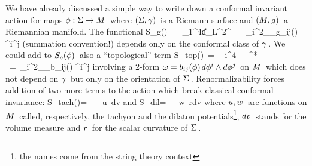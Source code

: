 \no We have already discussed a simple way
to write down a conformal invariant action
for maps \s$\phi:\Sigma\rightarrow M\hspace{0.05cm}$ where
\s$(\Sigma,{{\gamma}})\hspace{0.05cm}$ is a Riemann surface and \s$(M,g)\hspace{0.05cm}$
a Riemannian manifold. The functional
\qq
S_g(\phi)\ =\ {_1\over^{4\pi}}\m\|d\phi\|_{L^2}^{}\ =\
{_i\over^{2\pi}}\int_{_\Sigma}g_{ij}(\phi)
\s\s\da\phi^i\wedge\de\phi^j
\label{sm}
\qqq
(summation convention!) depends only on the conformal
class of \s${{\gamma}}\hspace{0.05cm}$.
We could add to \s$S_g(\phi)\hspace{0.05cm}$ also a ``topological'' term
\qq
S_{top}(\phi)\ =\ {_i\over^{4\pi}}\s\int_{_\Sigma}\phi^*\omega
\ =\ {_i\over^{2\pi}}\int_{_\Sigma}b_{ij}(\phi)
\s\s\da\phi^i\wedge\de\phi^j
\label{stop}
\qqq
involving a 2-form \s$\omega=b_{ij}(\phi)\hspace{0.05cm} d\phi^i
\wedge d\phi^j\hspace{0.05cm}$ on \s$M\hspace{0.05cm}$ which does not
depend on \s${{\gamma}}\hspace{0.05cm}$ but only on the orientation of \s$\Sigma\hspace{0.05cm}$.
Renormalizability forces addition of two more terms
to the action which break classical conformal invariance:
\qq
S_{tach}(\phi)\s=\s{_1\over^{4\pi}}
\int_{_\Sigma}u\circ\phi\ dv\quad\quad
{\rm and}\quad\quad
S_{dil}\s=\s{_1\over^{4\pi}}\int_{_\Sigma}w\circ\phi\ r\s\m dv
\label{tach}
\qqq
where \s$u,w\hspace{0.05cm}$ are functions on \s$M\hspace{0.05cm}$ called, respectively, the
tachyon and the dilaton potentials\footnote{the names
come from the string theory context}, \s$dv\hspace{0.05cm}$ stands
for the volume measure and \s$r\hspace{0.05cm}$ for the scalar
curvature of \s$\Sigma\hspace{0.05cm}$.
\vskip 0.4cm

